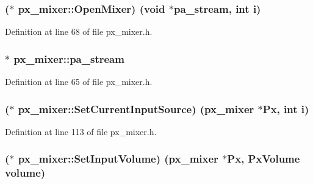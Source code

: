 \subsubsection[{\texorpdfstring{Open\+Mixer}{OpenMixer}}]{($\ast$ px\+\_\+mixer\+::\+Open\+Mixer) ({\bf void} $\ast${\bf pa\+\_\+stream}, {\bf int} {\bf i})}\hypertarget{structpx__mixer_aa30b3ee0d86e178ab6b5091bc25b7b68}{}\label{structpx__mixer_aa30b3ee0d86e178ab6b5091bc25b7b68}


Definition at line 68 of file px\+\_\+mixer.\+h.

\subsubsection[{\texorpdfstring{pa\+\_\+stream}{pa_stream}}]{$\ast$ px\+\_\+mixer\+::pa\+\_\+stream}\hypertarget{structpx__mixer_a1a383cd6937c83a4361c5a07a58775d7}{}\label{structpx__mixer_a1a383cd6937c83a4361c5a07a58775d7}


Definition at line 65 of file px\+\_\+mixer.\+h.

\subsubsection[{\texorpdfstring{Set\+Current\+Input\+Source}{SetCurrentInputSource}}]{($\ast$ px\+\_\+mixer\+::\+Set\+Current\+Input\+Source) ({\bf px\+\_\+mixer} $\ast$Px, {\bf int} {\bf i})}\hypertarget{structpx__mixer_a8f44d0008590c9c7697384fbe6451585}{}\label{structpx__mixer_a8f44d0008590c9c7697384fbe6451585}


Definition at line 113 of file px\+\_\+mixer.\+h.

\subsubsection[{\texorpdfstring{Set\+Input\+Volume}{SetInputVolume}}]{($\ast$ px\+\_\+mixer\+::\+Set\+Input\+Volume) ({\bf px\+\_\+mixer} $\ast$Px, {\bf Px\+Volume} volume)}\hypertarget{structpx__mixer_a9f837efc2822f28da6f3017d164c72d3}{}\label{structpx__mixer_a9f837efc2822f28da6f3017d164c72d3}


